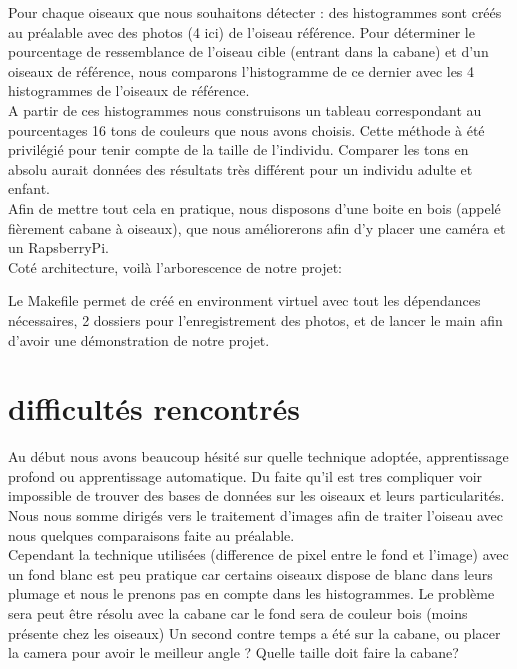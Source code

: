 \documentclass{article}
\begin{document}
Pour chaque oiseaux que nous souhaitons détecter : des histogrammes sont créés au préalable avec des photos (4 ici) de l'oiseau référence.
Pour déterminer le pourcentage de ressemblance de l'oiseau cible (entrant dans la cabane) et d'un oiseaux de référence, nous comparons l'histogramme de ce dernier avec les 4 histogrammes de l'oiseaux de référence. \\

A partir de ces histogrammes nous construisons un tableau correspondant au pourcentages 16 tons de couleurs que nous avons choisis.
Cette méthode à été privilégié pour tenir compte de la taille de l'individu.
Comparer les tons en absolu aurait données des résultats très différent pour un individu adulte et enfant. \\

Afin de mettre tout cela en pratique, nous disposons d'une boite en bois  (appelé fièrement cabane à oiseaux), que nous améliorerons afin d'y placer une caméra et un RapsberryPi.\\

Coté architecture, voilà l'arborescence de notre projet:


Le Makefile permet de créé en environment virtuel avec tout les dépendances nécessaires, 2 dossiers pour l'enregistrement des photos, et de lancer le main afin d'avoir une démonstration de notre projet.\\

\section{difficultés rencontrés}
Au début nous avons beaucoup hésité sur quelle technique adoptée, apprentissage profond ou apprentissage automatique. Du faite qu'il est tres compliquer voir  impossible de trouver des bases de données sur les oiseaux et leurs particularités. Nous nous somme dirigés vers le traitement d'images afin de traiter l'oiseau avec nous quelques comparaisons faite au préalable. \\ 
Cependant la technique utilisées (difference de pixel entre le fond et l'image) avec un fond blanc est peu pratique car certains oiseaux dispose de blanc dans leurs plumage et nous le prenons pas en compte dans les histogrammes. Le problème sera peut être résolu avec la cabane car le fond sera de couleur bois (moins présente chez les oiseaux)
Un second contre temps a été sur la cabane, ou placer la camera pour avoir le meilleur angle ? Quelle taille doit faire la cabane? 
\end{document}
